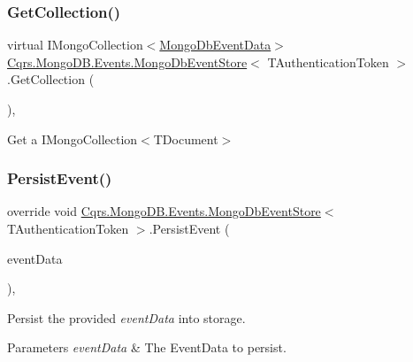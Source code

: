 \subsubsection{\texorpdfstring{Get\+Collection()}{GetCollection()}}
{\footnotesize\ttfamily virtual I\+Mongo\+Collection$<$\hyperlink{classCqrs_1_1MongoDB_1_1Events_1_1MongoDbEventData}{Mongo\+Db\+Event\+Data}$>$ \hyperlink{classCqrs_1_1MongoDB_1_1Events_1_1MongoDbEventStore}{Cqrs.\+Mongo\+D\+B.\+Events.\+Mongo\+Db\+Event\+Store}$<$ T\+Authentication\+Token $>$.Get\+Collection (\begin{DoxyParamCaption}{ }\end{DoxyParamCaption})\hspace{0.3cm}{\ttfamily [protected]}, {\ttfamily [virtual]}}



Get a I\+Mongo\+Collection$<$\+T\+Document$>$ 

\mbox{\label{classCqrs_1_1MongoDB_1_1Events_1_1MongoDbEventStore_a13f6823671d7cb9c042d8f7156a51b89_a13f6823671d7cb9c042d8f7156a51b89}} 
\subsubsection{\texorpdfstring{Persist\+Event()}{PersistEvent()}}
{\footnotesize\ttfamily override void \hyperlink{classCqrs_1_1MongoDB_1_1Events_1_1MongoDbEventStore}{Cqrs.\+Mongo\+D\+B.\+Events.\+Mongo\+Db\+Event\+Store}$<$ T\+Authentication\+Token $>$.Persist\+Event (\begin{DoxyParamCaption}\item[{\hyperlink{classCqrs_1_1Events_1_1EventData}{Event\+Data}}]{event\+Data }\end{DoxyParamCaption})\hspace{0.3cm}{\ttfamily [protected]}, {\ttfamily [virtual]}}



Persist the provided {\itshape event\+Data}  into storage. 


\begin{DoxyParams}{Parameters}
{\em event\+Data} & The Event\+Data to persist.\\
\hline
\end{DoxyParams}



